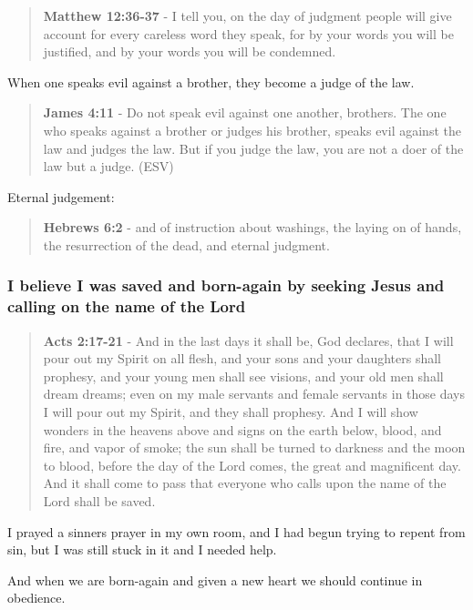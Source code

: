 \documentclass[11pt]{article}
\begin{document}
\begin{quote}
\textbf{Matthew 12:36-37} - I tell you, on the day of judgment people will give account for every careless word they speak, for by your words you will be justified, and by your words you will be condemned.
\end{quote}

When one speaks evil against a brother, they become a judge of the law.

\begin{quote}
\textbf{James 4:11} - Do not speak evil against one another, brothers. The one who speaks against a brother or judges his brother, speaks evil against the law and judges the law. But if you judge the law, you are not a doer of the law but a judge. (ESV)
\end{quote}

Eternal judgement:

\begin{quote}
\textbf{Hebrews 6:2} - and of instruction about washings, the laying on of hands, the resurrection of the dead, and eternal judgment.
\end{quote}

\subsubsection{I believe I was saved and born-again by seeking Jesus and calling on the name of the Lord}
\label{sec:org7acd093}

\begin{quote}
\textbf{Acts 2:17-21} - And in the last days it shall be, God declares, that I will pour out my Spirit on all flesh, and your sons and your daughters shall prophesy, and your young men shall see visions, and your old men shall dream dreams; even on my male servants and female servants in those days I will pour out my Spirit, and they shall prophesy. And I will show wonders in the heavens above and signs on the earth below, blood, and fire, and vapor of smoke; the sun shall be turned to darkness and the moon to blood, before the day of the Lord comes, the great and magnificent day. And it shall come to pass that everyone who calls upon the name of the Lord shall be saved.
\end{quote}

I prayed a sinners prayer in my own room, and I had begun trying to repent from sin, but I was still stuck in it and I needed help.

And when we are born-again and given a new heart we should continue in obedience.
\end{document}

